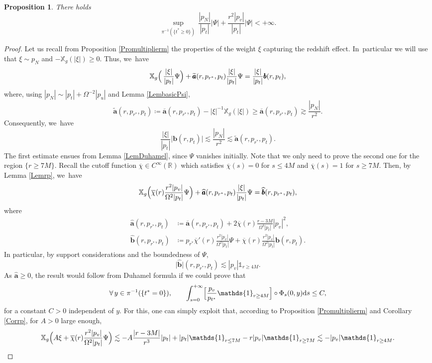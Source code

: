 \documentclass[10pt]{amsart}
\theoremstyle{plain}
\newtheorem{proposition}{Proposition}[section]
\theoremstyle{definition}
\newcommand\R{{\mathbb{R}}}
\newcommand\T{{\mathbb{X}}}
\newcommand\dr{{\mathrm{d}}}
\begin{document}
\begin{proposition}\label{ProboundPsiA}
There holds
\[
\sup_{ \pi^{-1} (\{t^* \geq 0 \})} \, \frac{|p_N|}{|p_t|}|\Psi|+\frac{r^2|p_v|}{|p_t|}|\Psi| < +\infty.
\]
\end{proposition}
\begin{proof}
Let us recall from Proposition \ref{Promultiplierm} the properties of the weight $\xi$ capturing the redshift effect. In~particular we will use that $\xi \sim p_N$ and $-\T_g(|\xi|) \geq 0$. Thus, we~have
\begin{equation*}
\T_g \Bigl(\, \frac{|\xi|}{|p_t|} \Psi \Bigr)+ \widetilde{\pmb{a}} (r,p_{r^*},p_t)\frac{|\xi|}{|p_t|} \Psi= \frac{|\xi|}{|p_t|}\pmb{b}(r,p_t),
\end{equation*}
where, using $|p_N|\sim |p_t|+\Omega^{-2} |p_u|$ and Lemma \ref{LembasicPsi},
\[
\widetilde{\pmb{a}} (r,p_{r^*},p_t) \coloneqq \overline{\pmb{a}} (r,p_{r^*},p_t)-|\xi|^{-1}\T_g(|\xi|) \geq \overline{\pmb{a}} (r,p_{r^*},p_t) \gtrsim \frac{|p_N|}{r^2}.
\]
Consequently, we~have
\[
\frac{|\xi|}{|p_t|} \big| \pmb{b} (r,p_t) \big| \lesssim \frac{|p_N|}{r^2} \lesssim \widetilde{\pmb{a}} (r,p_{r^*},p_t).
\]
The first estimate ensues from Lemma \ref{LemDuhamel}, since $\Psi$ vanishes initially. Note that we only need to prove the second one for the region $\{ r \geq 7M \}$. Recall the cutoff function $\overline{\chi} \in C^\infty (\R)$ which satisfies $\overline{\chi} (s) =0$ for $s \leq 4M$ and $\overline{\chi}(s) =1$ for $s \geq 7M$. Then, by Lemma \ref{Lemrp}, we~have
\begin{equation*}
\T_g \Bigl(\overline{\chi} (r) \frac{r^2|p_v|}{\Omega^2|p_t|} \Psi \Bigr)+ \widehat{\pmb{a}} (r,p_{r^*},p_t)\frac{|\xi|}{|p_t|} \Psi= \widehat{\pmb{b}}(r,p_{r^*},p_t),
\end{equation*}
where
\begin{align*}
\widehat{\pmb{a}} (r,p_{r^*},p_t) & \coloneqq \overline{\pmb{a}} (r,p_{r^*},p_t)+2\overline{\chi}(r)\frac{r-3M}{\Omega^4|p_t|}|p_v|^2, \\
\widehat{\pmb{b}}(r,p_{r^*},p_t) & \coloneqq p_{r^*} \overline{\chi}'(r)\frac{r^2|p_v|}{\Omega^2|p_t|} \Psi+ \overline{\chi} (r) \frac{r^2|p_v|}{\Omega^2|p_t|}\pmb{b}(r,p_t).
\end{align*}
In particular, by support considerations and the boundedness of $\Psi$,
\[
\big| \widehat{\pmb{b}} \big|(r,p_{r^*},p_t) \lesssim |p_v| \mathds{1}_{r \geq 4M}.
\]
As $\widehat{\pmb{a}} \geq 0$, the result would follow from Duhamel formula if we could prove that
\[
\forall \, y \in \pi^{-1}(\{t^*=0\}), \qquad \int_{s=0}^{+\infty} \Bigl[ \frac{p_v}{p_{t^*}} \mathds{1}_{r \geq 4M} \Bigr] \circ \Phi_s (0,y) \dr s \leq C,
\]
for a constant $C>0$ independent of $y$. For this, one can simply exploit that, according to Proposition \ref{Promultiplierm} and Corollary \ref{Corrp}, for $A>0$ large enough,
\[
\T_g \Bigl(A \xi + \overline{\chi} (r) \frac{r^2|p_v|}{\Omega^2|p_t|} \Psi \Bigr) \lesssim -A\frac{|r-3M|}{r^3}|p_t|+ |p_t|\mathds{1}_{r \leq 7M}-r|p_v| \mathds{1}_{r \geq 7M} \lesssim -|p_v| \mathds{1}_{r \geq 4M}.
\]
\end{proof}
\end{document}
